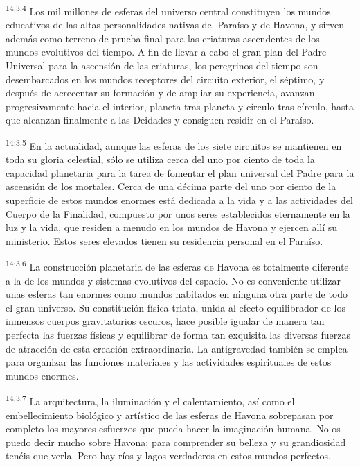 \par
\textsuperscript{14:3.4} Los mil millones de esferas del universo central constituyen los mundos educativos de las altas personalidades nativas del Paraíso y de Havona, y sirven además como terreno de prueba final para las criaturas ascendentes de los mundos evolutivos del tiempo. A fin de llevar a cabo el gran plan del Padre Universal para la ascensión de las criaturas, los peregrinos del tiempo son desembarcados en los mundos receptores del circuito exterior, el séptimo, y después de acrecentar su formación y de ampliar su experiencia, avanzan progresivamente hacia el interior, planeta tras planeta y círculo tras círculo, hasta que alcanzan finalmente a las Deidades y consiguen residir en el Paraíso.

\par
\textsuperscript{14:3.5} En la actualidad, aunque las esferas de los siete circuitos se mantienen en toda su gloria celestial, sólo se utiliza cerca del uno por ciento de toda la capacidad planetaria para la tarea de fomentar el plan universal del Padre para la ascensión de los mortales. Cerca de una décima parte del uno por ciento de la superficie de estos mundos enormes está dedicada a la vida y a las actividades del Cuerpo de la Finalidad, compuesto por unos seres establecidos eternamente en la luz y la vida, que residen a menudo en los mundos de Havona y ejercen allí su ministerio. Estos seres elevados tienen su residencia personal en el Paraíso.

\par
\textsuperscript{14:3.6} La construcción planetaria de las esferas de Havona es totalmente diferente a la de los mundos y sistemas evolutivos del espacio. No es conveniente utilizar unas esferas tan enormes como mundos habitados en ninguna otra parte de todo el gran universo. Su constitución física triata, unida al efecto equilibrador de los inmensos cuerpos gravitatorios oscuros, hace posible igualar de manera tan perfecta las fuerzas físicas y equilibrar de forma tan exquisita las diversas fuerzas de atracción de esta creación extraordinaria. La antigravedad también se emplea para organizar las funciones materiales y las actividades espirituales de estos mundos enormes.

\par
\textsuperscript{14:3.7} La arquitectura, la iluminación y el calentamiento, así como el embellecimiento biológico y artístico de las esferas de Havona sobrepasan por completo los mayores esfuerzos que pueda hacer la imaginación humana. No os puedo decir mucho sobre Havona; para comprender su belleza y su grandiosidad tenéis que verla. Pero hay ríos y lagos verdaderos en estos mundos perfectos.

